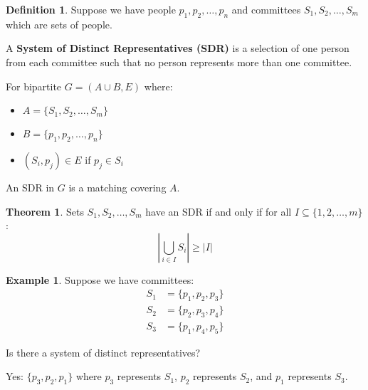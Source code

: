 \documentclass{article}
\theoremstyle{definition}
\newtheorem{example}{Example}
\newtheorem{theorem}{Theorem}
\newtheorem{definition}{Definition}
\begin{document}
\pagebreak
\newpage
\clearpage

\begin{definition}
Suppose we have people $p_1, p_2, \ldots, p_n$ and committees $S_1, S_2, \ldots, S_m$ which are sets of people.

A \textbf{System of Distinct Representatives (SDR)} is a selection of one person from each committee such that no person represents more than one committee.
\end{definition}


For bipartite $G = (A\cup B, E)$ where:
\begin{itemize}
  \item $A = \{S_1, S_2, \ldots, S_m\}$
  \item $B = \{p_1, p_2, \ldots, p_n\}$
  \item $(S_i, p_j) \in E$ if $p_j \in S_i$
\end{itemize}

An SDR in $G$ is a matching covering $A$.

\begin{theorem}
Sets $S_1, S_2, \ldots, S_m$ have an SDR if and only if for all $I \subseteq \{1,2,\ldots,m\}$: 
\begin{equation}
\left|\bigcup_{i\in I} S_i\right| \geq |I|
\end{equation}
\end{theorem}

\begin{example}
Suppose we have committees:
\begin{align*}
S_1 &= \{p_1, p_2, p_3\} \\
S_2 &= \{p_2, p_3, p_4\} \\
S_3 &= \{p_1, p_4, p_5\}
\end{align*}

Is there a system of distinct representatives?

Yes: $\{p_3, p_2, p_1\}$ where $p_3$ represents $S_1$, $p_2$ represents $S_2$, and $p_1$ represents $S_3$.
\end{example}
\end{document}
